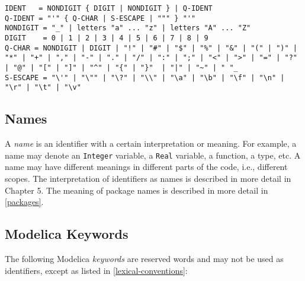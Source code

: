 \begin{lstlisting}[language=grammar]
IDENT   = NONDIGIT { DIGIT | NONDIGIT } | Q-IDENT
Q-IDENT = "'" { Q-CHAR | S-ESCAPE | """ } "'"
NONDIGIT = "_" | letters "a" ... "z" | letters "A" ... "Z"
DIGIT    = 0 | 1 | 2 | 3 | 4 | 5 | 6 | 7 | 8 | 9
Q-CHAR = NONDIGIT | DIGIT | "!" | "#" | "$" | "%" | "&" | "(" | ")" | "*" | "+" | "," | "-" | "." | "/" | ":" | ";" | "<" | ">" | "=" | "?" | "@" | "[" | "]" | "^" | "{" | "}"  | "|" | "~" | " "_
S-ESCAPE = "\'" | "\"" | "\?" | "\\" | "\a" | "\b" | "\f" | "\n" | "\r" | "\t" | "\v"
\end{lstlisting}

\subsection{Names}

A \emph{name} is an identifier with a certain interpretation or meaning.
For example, a name may denote an \lstinline[basicstyle=\ttfamily]!Integer! variable, a \lstinline[basicstyle=\ttfamily]!Real! variable, a
function, a type, etc. A name may have different meanings in different
parts of the code, i.e., different scopes. The interpretation of
identifiers as names is described in more detail in Chapter 5. The
meaning of package names is described in more detail in \autoref{packages}.

\subsection{Modelica Keywords}

The following Modelica \emph{keywords} are reserved words and may not be
used as identifiers, except as listed in \autoref{lexical-conventions}:

